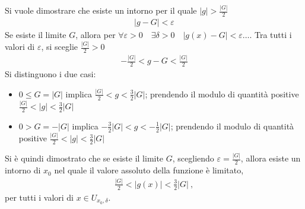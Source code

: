 \documentclass[letterpaper,10pt,italian]{jupyterBook}
\begin{document}
\sphinxAtStartPar
Si vuole dimostrare che esiste un intorno per il quale \(|g| > \frac{|G|}{2}\)
\begin{equation*}
\begin{split}|g - G| < \varepsilon\end{split}
\end{equation*}
\sphinxAtStartPar
Se esiste il limite \(G\), allora per \(\forall \varepsilon > 0 \quad \exists \delta > 0 \quad |g(x) - G|<\varepsilon \dots\). Tra tutti i valori di \(\varepsilon\), si sceglie \(\frac{|G|}{2} > 0\)
\begin{equation*}
\begin{split}-\frac{|G|}{2} < g - G < \frac{|G|}{2} \end{split}
\end{equation*}
\sphinxAtStartPar
Si distinguono i due casi:
\begin{itemize}
\item {} 
\sphinxAtStartPar
\(0 \le G = |G|\) implica \(\frac{|G|}{2} < g < \frac{3}{2}|G|\); prendendo il modulo di quantità positive \(\frac{|G|}{2} < |g| < \frac{3}{2}|G|\)

\item {} 
\sphinxAtStartPar
\(0 > G = - |G|\) implica \(-\frac{3}{2}|G| < g < -\frac{1}{2}|G| \); prendendo il modulo di quantità positive \(\frac{|G|}{2} < |g| < \frac{3}{2}|G|\)

\end{itemize}

\sphinxAtStartPar
Si è quindi dimostrato che se esiste il limite \(G\), scegliendo \(\varepsilon = \frac{|G|}{2}\), allora esiste un intorno di \(x_0\) nel quale il valore assoluto della funzione è limitato,
\begin{equation*}
\begin{split}\frac{|G|}{2} < |g(x)| < \frac{3}{2}|G| \ ,\end{split}
\end{equation*}
\sphinxAtStartPar
per tutti i valori di \(x \in U_{x_0, \delta}\).
\end{document}
